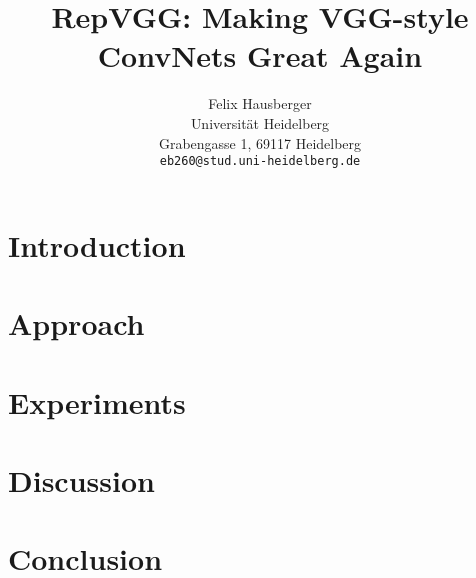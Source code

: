 \documentclass[final]{cvpr}
\begin{document}
\title{RepVGG: Making VGG-style ConvNets Great Again}

\author{Felix Hausberger\\
	Universität Heidelberg\\
	Grabengasse 1, 69117 Heidelberg\\
	{\tt\small eb260@stud.uni-heidelberg.de}
}

\maketitle

\begin{abstract}
	
\end{abstract}

\section{Introduction}





\section{Approach}


\section{Experiments}


\section{Discussion}


\section{Conclusion}


{\small


}
\end{document}
